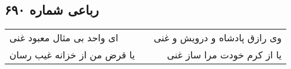 \begin{center}
\section*{رباعی شماره ۶۹۰}
\label{sec:sh690}
\begin{longtable}{l p{0.5cm} r}
ای واحد بی مثال معبود غنی
&&
وی رازق پادشاه و درویش و غنی
\\
یا قرض من از خزانه غیب رسان
&&
یا از کرم خودت مرا ساز غنی
\\
\end{longtable}
\end{center}
